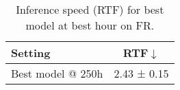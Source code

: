 \begin{table}[htbp!]
\centering
\small
\begin{tabular}{lc}
\toprule
Setting & RTF$\downarrow$ \\
\midrule
Best model @ 250h & 2.43 ± 0.15 \\
\bottomrule
\end{tabular}
\caption{Inference speed (RTF) for best model at best hour on FR.}
\label{tab:speed-best-fr}
\end{table}
